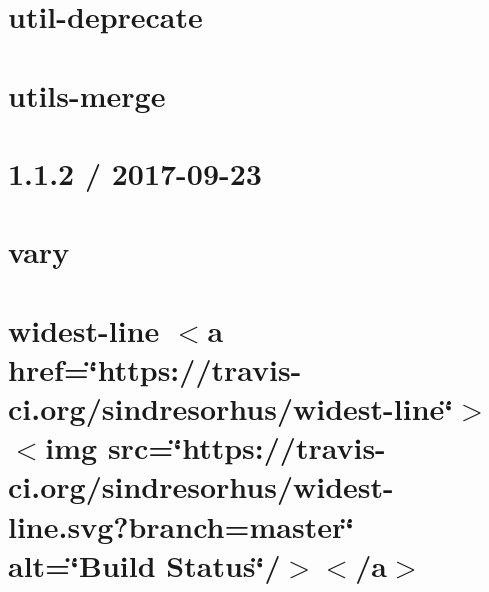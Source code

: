 \let\mypdfximage\pdfximage\def\pdfximage{\immediate\mypdfximage}\documentclass[twoside]{book}
\newcommand{\+}{\discretionary{\mbox{\scriptsize$\hookleftarrow$}}{}{}}
\begin{document}
\chapter{util-\/deprecate}
\label{md__c_1__git_hub__p_r_o_y_e_c_t_o-_i_i_i-_g_o_t_rest-api_node_modules_util-deprecate__r_e_a_d_m_e}

\chapter{utils-\/merge}
\label{md__c_1__git_hub__p_r_o_y_e_c_t_o-_i_i_i-_g_o_t_rest-api_node_modules_utils-merge__r_e_a_d_m_e}

\chapter{1.1.2 / 2017-\/09-\/23}
\label{md__c_1__git_hub__p_r_o_y_e_c_t_o-_i_i_i-_g_o_t_rest-api_node_modules_vary__h_i_s_t_o_r_y}

\chapter{vary}
\label{md__c_1__git_hub__p_r_o_y_e_c_t_o-_i_i_i-_g_o_t_rest-api_node_modules_vary__r_e_a_d_m_e}

\chapter{widest-\/line $<$a href=\char`\"{}https\+://travis-\/ci.\+org/sindresorhus/widest-\/line\char`\"{}$>$$<$img src=\char`\"{}https\+://travis-\/ci.\+org/sindresorhus/widest-\/line.\+svg?branch=master\char`\"{} alt=\char`\"{}\+Build Status\char`\"{}/$>$$<$/a$>$}
\label{md__c_1__git_hub__p_r_o_y_e_c_t_o-_i_i_i-_g_o_t_rest-api_node_modules_widest-line_readme}

\end{document}
